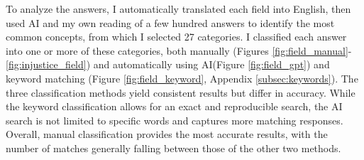 \documentclass[12pt,english]{article}
\begin{document}
\begin{bibunit}
To analyze the answers, I automatically translated each field into English, then used AI and my own reading of a few hundred answers to identify the most common concepts, from which I selected 27 categories. I classified each answer into one or more of these categories, both manually (Figures \ref{fig:field_manual}-\ref{fig:injustice_field}) and automatically using AI(Figure \ref{fig:field_gpt}) and keyword matching (Figure \ref{fig:field_keyword}, Appendix \ref{subsec:keywords}). 
The three classification methods yield consistent results but differ in accuracy. While the keyword classification allows for an exact and reproducible search, the AI search is not limited to specific words and captures more matching responses. Overall, manual classification provides the most accurate results, with the number of matches generally falling between those of the other two methods. 


\end{bibunit}
\end{document}
